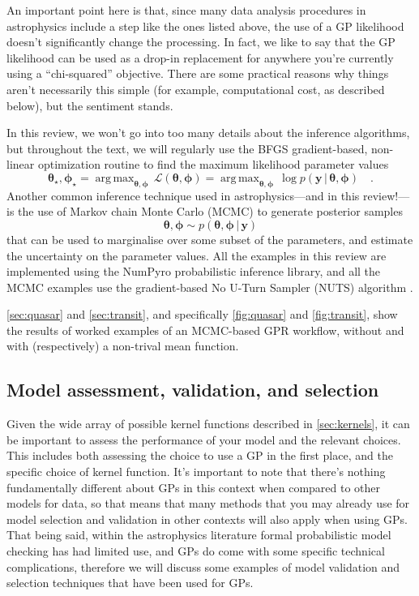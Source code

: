 \documentclass[letterpaper]{ar-1col}
\newcommand{\ydata}{\ensuremath{\boldsymbol{y}}}
\newcommand{\hyperparams}{\ensuremath{\boldsymbol{\phi}}}
\newcommand{\meanparams}{\ensuremath{\boldsymbol{\theta}}}
\DeclareMathOperator*{\argmax}{arg\,max}
\begin{document}
An important point here is that, since many data analysis procedures in astrophysics include a step like the ones listed above, the use of a GP likelihood doesn't significantly change the processing.
In fact, we like to say that the GP likelihood can be used as a drop-in replacement for anywhere you're currently using a ``chi-squared'' objective.
There are some practical reasons why things aren't necessarily this simple (for example, computational cost, as described below), but the sentiment stands.

In this review, we won't go into too many details about the inference algorithms, but throughout the text, we will regularly use the \textsf{BFGS} gradient-based, non-linear optimization routine \citep{Nocedal:1999, scipy} to find the maximum likelihood parameter values
\begin{equation}
  \meanparams_\star,\hyperparams_\star = \argmax_{\meanparams,\hyperparams} \,\mathcal{L}(\meanparams,\hyperparams) = \argmax_{\meanparams,\hyperparams} \,\log p(\ydata\,|\,\meanparams,\hyperparams) \quad.
\end{equation}
Another common inference technique used in astrophysics---and in this review!---is the use of Markov chain Monte Carlo (MCMC) to generate posterior samples
\begin{equation}
  \meanparams,\hyperparams \sim p(\meanparams,\hyperparams\,|\,\ydata)
\end{equation}
that can be used to marginalise over some subset of the parameters, and estimate the uncertainty on the parameter values.
All the examples in this review are implemented using the \textsf{NumPyro} probabilistic inference library, and all the MCMC examples use the gradient-based No U-Turn Sampler (NUTS) algorithm \citep{Hoffman:2014}.

\autoref{sec:quasar} and \autoref{sec:transit}, and specifically \autoref{fig:quasar} and \autoref{fig:transit}, show the results of worked examples of an MCMC-based GPR workflow, without and with (respectively) a non-trival mean function.


\subsection{Model assessment, validation, and selection}
\label{sec:model_selection}

Given the wide array of possible kernel functions described in \autoref{sec:kernels}, it can be important to assess the performance of your model and the relevant choices.
This includes both assessing the choice to use a GP in the first place, and the specific choice of kernel function.
It's important to note that there's nothing fundamentally different about GPs in this context when compared to other models for data, so that means that many methods that you may already use for model selection and validation in other contexts will also apply when using GPs.
That being said, within the astrophysics literature formal probabilistic model checking has had limited use, and GPs do come with some specific technical complications, therefore we will discuss some examples of model validation and selection techniques that have been used for GPs.
\end{document}
